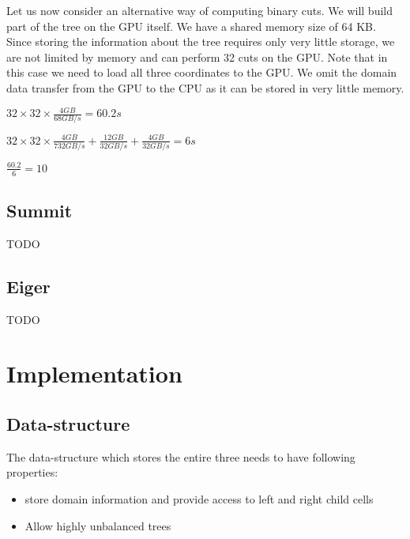 \documentclass[]{article}
\begin{document}
Let us now consider an alternative way of computing binary cuts. We will build part of the tree on the GPU itself. We have a shared memory size of 64 KB. Since storing the information about the tree requires only very little storage, we are not limited by memory and can perform 32 cuts on the GPU. Note that in this case we need to load all three coordinates to the GPU. We omit the domain data transfer from the GPU to the CPU as it can be stored in very little memory. 

\begin{center}
	$32 \times 32 \times \frac{ 4 GB}{68 GB/s} = 60.2 s$ 
\end{center}

\begin{center}
	$32 \times 32 \times \frac{4 GB}{732 GB/s} + \frac{12 GB}{32 GB/s} + \frac{4 GB}{32 GB/s} = 6 s$ 
\end{center}

\begin{center}
	$\frac{60.2}{6} = 10$ 
\end{center}

\subsection{Summit}

TODO

\subsection{Eiger}

TODO 

\section{Implementation}

\subsection{Data-structure}

The data-structure which stores the entire three needs to have following properties:

\begin{itemize}
	\item store domain information and provide access to left and right child cells
	\item Allow highly unbalanced trees
\end{itemize}
\end{document}
